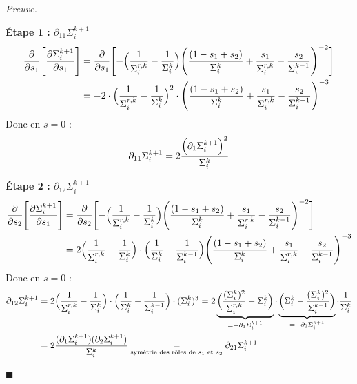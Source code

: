 \documentclass[12pt]{article}
\renewcommand{\qedsymbol}{$\blacksquare$}
\renewenvironment{proof}[1][\proofname]{%
  \par\medskip\noindent
  \textit{\color{proofgray}#1.}\enspace\ignorespaces
}{\hfill\qedsymbol\par\medskip}
\renewcommand{\proofname}{Preuve}
\begin{document}
\begin{proof}

\textbf{Étape 1 : $\partial_{11}\Sigma_i^{k+1}$}
\begin{equation*}
    \begin{aligned}
\frac{\partial}{\partial s_1}\Biggl[ \frac{\partial \Sigma_i^{k+1}}{\partial s_1} \Biggr] &= \frac{\partial}{\partial s_1}\Biggl[  - \Bigl(\frac{1}{\Sigma_i^{r,k} } - \frac{1}{\Sigma_i^k}\Bigr) \Biggl( \frac{(1-s_1+s_2)}{\Sigma_i^{k}} + \frac{s_1}{\Sigma_i^{r,k}} - \frac{s_2}{\Sigma_i^{k-1}} \Biggr)^{-2}
\Biggr] \\
&= -2 \cdot \Bigl(\frac{1}{\Sigma_i^{r,k} } - \frac{1}{\Sigma_i^k}\Bigr)^2\cdot \Biggl( \frac{(1-s_1+s_2)}{\Sigma_i^{k}} + \frac{s_1}{\Sigma_i^{r,k}} - \frac{s_2}{\Sigma_i^{k-1}} \Biggr)^{-3}
    \end{aligned}
\end{equation*}
Donc en $s=0$ :
\begin{equation*}
\partial_{11} \Sigma_i^{k+1} = 2 \frac{\Bigl(\partial_1 \Sigma_i^{k+1}\Bigr)^2}{\Sigma_i^k}
\end{equation*}

\medskip
\textbf{Étape 2 : $\partial_{12}\Sigma_i^{k+1}$}
\begin{equation*}
    \begin{aligned}
\frac{\partial}{\partial s_2} \Biggl[ 
    \frac{\partial \Sigma_i^{k+1}}{\partial s_1}
\Biggr] &= \frac{\partial}{\partial s_2} \Biggl[ 
 - \Bigl(\frac{1}{\Sigma_i^{r,k} } - \frac{1}{\Sigma_i^k}\Bigr) \Biggl( \frac{(1-s_1+s_2)}{\Sigma_i^{k}} + \frac{s_1}{\Sigma_i^{r,k}} - \frac{s_2}{\Sigma_i^{k-1}} \Biggr)^{-2}
\Biggr]\\
&= 2  \Bigl(
    \frac{1}{\Sigma_i^{r,k} } - \frac{1}{\Sigma_i^k}
\Bigr) \cdot \Bigl( 
        \frac{1}{\Sigma_i^{k}} - \frac{1}{\Sigma_i^{k-1}}
\Bigr) 
\Biggl( \frac{(1-s_1+s_2)}{\Sigma_i^{k}} + \frac{s_1}{\Sigma_i^{r,k}} - \frac{s_2}{\Sigma_i^{k-1}} \Biggr)^{-3}
    \end{aligned}
\end{equation*}
Donc en $s=0$ :
\begin{equation*}
\begin{aligned}
\partial_{12} \Sigma_i^{k+1} &= 2 \Bigl(
    \frac{1}{\Sigma_i^{r,k} } - \frac{1}{\Sigma_i^k}
\Bigr) \cdot \Bigl( 
        \frac{1}{\Sigma_i^{k}} - \frac{1}{\Sigma_i^{k-1}}
\Bigr)
\cdot (\Sigma_i^k)^3 = 2 
\underbrace{
\Bigl(
    \frac{(\Sigma_i^k)^2}{\Sigma_i^{r,k} } - \Sigma_i^k
\Bigr)}_{=-\partial_1 \Sigma_i^{k+1}}
 \cdot 
 \underbrace{
 \Bigl( 
        \Sigma_i^{k} - \frac{(\Sigma_i^k)^2}{\Sigma_i^{k-1}}
\Bigr)}_{=-\partial_2 \Sigma_i^{k+1} } \cdot \frac{1}{\Sigma_i^k}\\
&=
2\frac{(\partial_1 \Sigma_i^{k+1})(\partial_2 \Sigma_i^{k+1})}{\Sigma_i^k} \underset{\text{symétrie des rôles de $s_1$ et $s_2$}}{=} \partial_{21} \Sigma_i^{k+1}
\end{aligned}
\end{equation*}


\end{proof}
\end{document}

